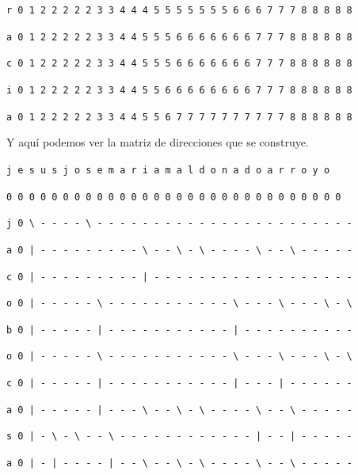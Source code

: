 \documentclass[11pt,a4paper]{article} %
\begin{document}
\texttt{r 0 1 2 2 2 2 2 3 3 4 4 4 5 5 5 5 5 5 5 6 6 6 7 7 7 8 8 8 8 8}

\texttt{a 0 1 2 2 2 2 2 3 3 4 4 5 5 5 6 6 6 6 6 6 6 7 7 7 8 8 8 8 8 8}

\texttt{c 0 1 2 2 2 2 2 3 3 4 4 5 5 5 6 6 6 6 6 6 6 7 7 7 8 8 8 8 8 8}

\texttt{i 0 1 2 2 2 2 2 3 3 4 4 5 5 6 6 6 6 6 6 6 6 7 7 7 8 8 8 8 8 8}

\texttt{a 0 1 2 2 2 2 2 3 3 4 4 5 5 6 7 7 7 7 7 7 7 7 7 7 8 8 8 8 8 8} \\

\normalsize

Y aquí podemos ver la matriz de direcciones que se construye.\\

\small

\hspace{1,72 em} \texttt{j e s u s j o s e m a r i a m a l d o n a d o a r r o y o}

\hspace{0,71 em} \texttt{0 0 0 0 0 0 0 0 0 0 0 0 0 0 0 0 0 0 0 0 0 0 0 0 0 0 0 0 0 0}

\texttt{j 0 \textbackslash{ }- - - - \textbackslash{ }- - - - - - - - - - - - - - - - - - - - - - -}

\texttt{a 0 | - - - - - - - - - \textbackslash{ }- - \textbackslash{ }- \textbackslash{ }- - - - \textbackslash{ }- - \textbackslash{ }- - - - -}

\texttt{c 0 | - - - - - - - - - | - - - - - - - - - - - - - - - - - -}

\texttt{o 0 | - - - - - \textbackslash{ }- - - - - - - - - - - \textbackslash{ }- - - \textbackslash{ }- - - \textbackslash{ }- \textbackslash}

\texttt{b 0 | - - - - - | - - - - - - - - - - - | - - - - - - - - - -}

\texttt{o 0 | - - - - - \textbackslash{ }- - - - - - - - - - - \textbackslash{ }- - - \textbackslash{ }- - - \textbackslash{ }- \textbackslash}

\texttt{c 0 | - - - - - | - - - - - - - - - - - | - - - | - - - - - -}

\texttt{a 0 | - - - - - | - - - \textbackslash{ }- - \textbackslash{ }- \textbackslash{ }- - - - \textbackslash{ }- - \textbackslash{ }- - - - -}

\texttt{s 0 | - \textbackslash{ }- \textbackslash{ }- - \textbackslash{ }- - - - - - - - - - - - | - - | - - - - -}

\texttt{a 0 | - | - - - - | - - \textbackslash{ }- - \textbackslash{ }- \textbackslash{ }- - - - \textbackslash{ }- - \textbackslash{ }- - - - -}
\end{document}

